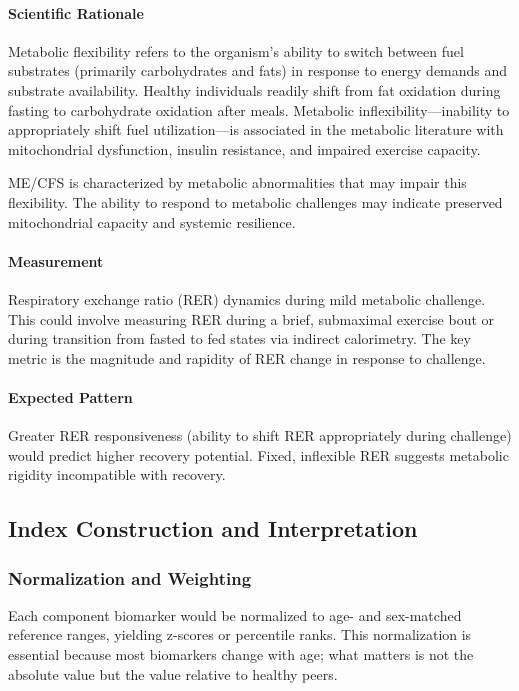 \paragraph{Scientific Rationale}
Metabolic flexibility refers to the organism's ability to switch between fuel substrates (primarily carbohydrates and fats) in response to energy demands and substrate availability. Healthy individuals readily shift from fat oxidation during fasting to carbohydrate oxidation after meals. Metabolic inflexibility---inability to appropriately shift fuel utilization---is associated in the metabolic literature with mitochondrial dysfunction, insulin resistance, and impaired exercise capacity.

ME/CFS is characterized by metabolic abnormalities that may impair this flexibility. The ability to respond to metabolic challenges may indicate preserved mitochondrial capacity and systemic resilience.

\paragraph{Measurement}
Respiratory exchange ratio (RER) dynamics during mild metabolic challenge. This could involve measuring RER during a brief, submaximal exercise bout or during transition from fasted to fed states via indirect calorimetry. The key metric is the magnitude and rapidity of RER change in response to challenge.

\paragraph{Expected Pattern}
Greater RER responsiveness (ability to shift RER appropriately during challenge) would predict higher recovery potential. Fixed, inflexible RER suggests metabolic rigidity incompatible with recovery.

\subsection{Index Construction and Interpretation}

\subsubsection{Normalization and Weighting}

Each component biomarker would be normalized to age- and sex-matched reference ranges, yielding z-scores or percentile ranks. This normalization is essential because most biomarkers change with age; what matters is not the absolute value but the value relative to healthy peers.

